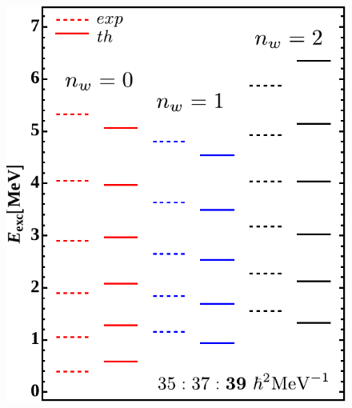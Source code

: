 \documentclass{beamer}
\begin{document}
\begin{frame}
\begin{itemize}
\begin{figure}
    \includegraphics[scale=0.44]{Figs/136Nd-excitation-higher-edited.pdf}
  \end{figure}
\end{itemize}
\end{frame}
\end{document}
